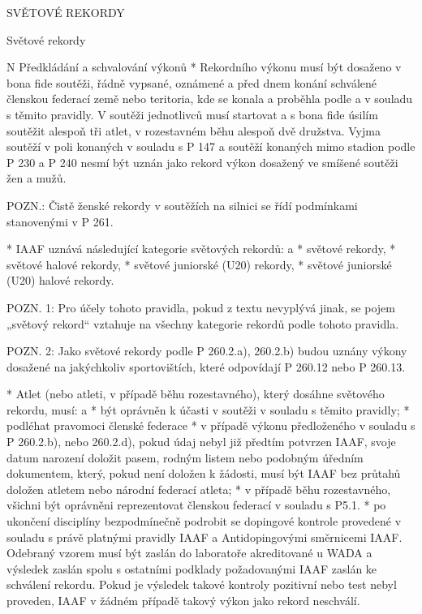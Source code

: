 \sec SVĚTOVÉ REKORDY

\secc Světové rekordy

\begitems \style N
Předkládání a schvalování výkonů
* Rekordního výkonu musí být dosaženo v bona fide soutěži, řádně vypsané, oznámené a před dnem konání schválené členskou federací země nebo teritoria, kde se konala a proběhla podle a v souladu s těmito pravidly. V soutěži jednotlivců musí startovat a s bona fide úsilím soutěžit alespoň tři atlet, v rozestavném běhu alespoň dvě družstva. Vyjma soutěží v poli konaných v souladu s P 147 a soutěží konaných mimo stadion podle P 230 a P 240 nesmí být uznán jako rekord výkon dosažený ve smíšené soutěži žen a mužů.

POZN.: Čistě ženské rekordy v soutěžích na silnici se řídí podmínkami stanovenými v P 261.

* IAAF uznává následující kategorie světových rekordů:
  \begitems \style a
  * světové rekordy,
  * světové halové rekordy,
  * světové juniorské (U20) rekordy,
  * světové juniorské (U20) halové rekordy.
  \enditems

POZN. 1: Pro účely tohoto pravidla, pokud z textu nevyplývá jinak, se pojem „světový rekord“ vztahuje na všechny kategorie rekordů podle tohoto pravidla.

POZN. 2: Jako světové rekordy podle P 260.2.a), 260.2.b) budou uznány výkony dosažené na jakýchkoliv sportovištích, které odpovídají P 260.12 nebo P 260.13.

* Atlet (nebo atleti, v případě běhu rozestavného), který dosáhne světového rekordu, musí:
  \begitems \style a
  * být oprávněn k účasti v soutěži v souladu s těmito pravidly;
  * podléhat pravomoci členské federace
  * v případě výkonu předloženého v souladu s P 260.2.b), nebo 260.2.d), pokud údaj nebyl již předtím potvrzen IAAF, svoje datum narození doložit pasem, rodným listem nebo podobným úředním dokumentem, který, pokud není doložen k žádosti, musí být IAAF bez průtahů doložen atletem nebo národní federací atleta;
  * v případě běhu rozestavného, všichni být oprávněni reprezentovat členskou federací v souladu s P5.1.
  * po ukončení disciplíny bezpodmínečně podrobit se dopingové kontrole provedené v souladu s právě platnými pravidly IAAF a Antidopingovými směrnicemi IAAF. Odebraný vzorem musí být zaslán do laboratoře akreditované u WADA a výsledek zaslán spolu s ostatními podklady požadovanými IAAF zaslán ke schválení rekordu. Pokud je výsledek takové kontroly pozitivní nebo test nebyl proveden, IAAF v žádném případě takový výkon jako rekord neschválí.
  \enditems

